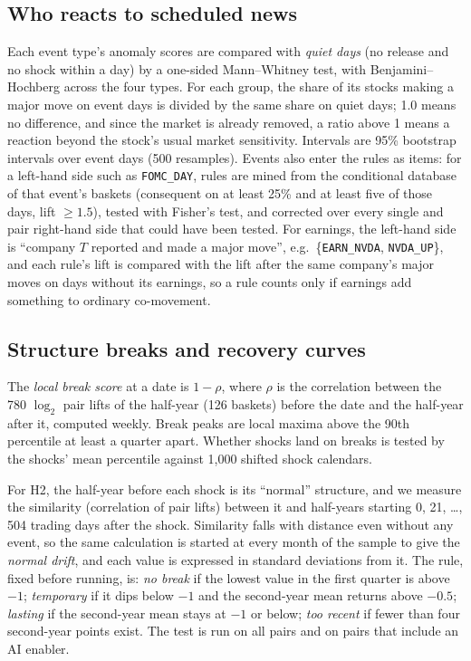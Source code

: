 \documentclass[conference]{IEEEtran}
\begin{document}
\subsection{Who reacts to scheduled news}
Each event type's anomaly scores are compared with \emph{quiet days} (no release and no shock within a day) by a one-sided Mann--Whitney test, with Benjamini--Hochberg across the four types. For each group, the share of its stocks making a major move on event days is divided by the same share on quiet days; 1.0 means no difference, and since the market is already removed, a ratio above 1 means a reaction beyond the stock's usual market sensitivity. Intervals are 95\% bootstrap intervals over event days (500 resamples). Events also enter the rules as items: for a left-hand side such as \texttt{FOMC\_DAY}, rules are mined from the conditional database of that event's baskets (consequent on at least 25\% and at least five of those days, lift $\geq1.5$), tested with Fisher's test, and corrected over every single and pair right-hand side that could have been tested. For earnings, the left-hand side is ``company $T$ reported and made a major move'', e.g.\ \{\texttt{EARN\_NVDA}, \texttt{NVDA\_UP}\}, and each rule's lift is compared with the lift after the same company's major moves on days without its earnings, so a rule counts only if earnings add something to ordinary co-movement.

\subsection{Structure breaks and recovery curves}
The \emph{local break score} at a date is $1-\rho$, where $\rho$ is the correlation between the 780 $\log_2$ pair lifts of the half-year (126 baskets) before the date and the half-year after it, computed weekly. Break peaks are local maxima above the 90th percentile at least a quarter apart. Whether shocks land on breaks is tested by the shocks' mean percentile against 1,000 shifted shock calendars.

For H2, the half-year before each shock is its ``normal'' structure, and we measure the similarity (correlation of pair lifts) between it and half-years starting 0, 21, \dots, 504 trading days after the shock. Similarity falls with distance even without any event, so the same calculation is started at every month of the sample to give the \emph{normal drift}, and each value is expressed in standard deviations from it. The rule, fixed before running, is: \emph{no break} if the lowest value in the first quarter is above $-1$; \emph{temporary} if it dips below $-1$ and the second-year mean returns above $-0.5$; \emph{lasting} if the second-year mean stays at $-1$ or below; \emph{too recent} if fewer than four second-year points exist. The test is run on all pairs and on pairs that include an AI enabler.
\end{document}
